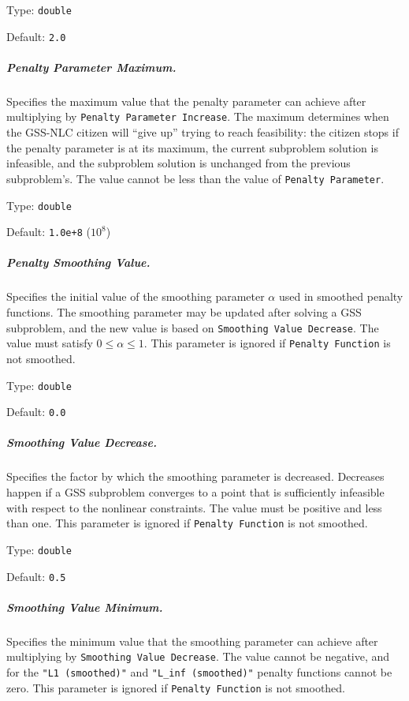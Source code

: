 \hspace{0.2in}
Type: {\tt double}

\hspace{0.2in}
Default: {\tt 2.0}

\subparagraph{Penalty Parameter Maximum.}  \label{param:GSN-penmax}
Specifies the maximum value that the penalty parameter can achieve after
multiplying by {\tt Penalty Parameter Increase}.  The maximum determines
when the GSS-NLC citizen will ``give up'' trying to reach feasibility:
the citizen stops if the penalty parameter is at its maximum, the current
subproblem solution is infeasible, and the subproblem solution is unchanged
from the previous subproblem's.
The value cannot be less than the value of {\tt Penalty Parameter}.

\hspace{0.2in}
Type: {\tt double}

\hspace{0.2in}
Default: {\tt 1.0e+8} ($10^8$)

\subparagraph{Penalty Smoothing Value.}  \label{param:GSN-pensmooth}
Specifies the initial value of the smoothing parameter $\alpha$ used in
smoothed penalty functions.
The smoothing parameter may be updated after solving a GSS subproblem, and
the new value is based on {\tt Smoothing Value Decrease}.
The value must satisfy $0 \leq \alpha \leq 1$.
This parameter is ignored if {\tt Penalty Function} is not smoothed.

\hspace{0.2in}
Type: {\tt double}

\hspace{0.2in}
Default: {\tt 0.0}

\subparagraph{Smoothing Value Decrease.}  \label{param:GSN-smoothdecrease}
Specifies the factor by which the smoothing parameter is decreased.  Decreases
happen if a GSS subproblem converges to a point that is sufficiently
infeasible with respect to the nonlinear constraints.
The value must be positive and less than one.
This parameter is ignored if {\tt Penalty Function} is not smoothed.

\hspace{0.2in}
Type: {\tt double}

\hspace{0.2in}
Default: {\tt 0.5}

\subparagraph{Smoothing Value Minimum.}  \label{param:GSN-smoothmin}
Specifies the minimum value that the smoothing parameter can achieve after
multiplying by {\tt Smoothing Value Decrease}.
The value cannot be negative, and for the {\tt "L1 (smoothed)"} and
{\tt "L\_inf (smoothed)"} penalty functions cannot be zero.
This parameter is ignored if {\tt Penalty Function} is not smoothed.

